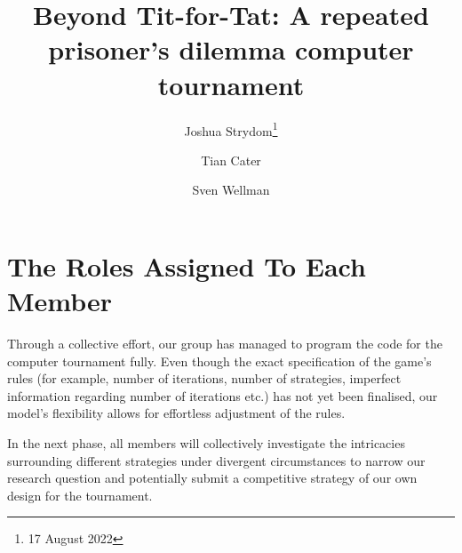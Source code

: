 \documentclass[11pt,preprint, authoryear]{elsarticle}
\numberwithin{equation}{section}
\numberwithin{figure}{section}
\numberwithin{table}{section}
\let\rmarkdownfootnote\footnote%
\def\footnote{\protect\rmarkdownfootnote}
\begin{document}
\begin{frontmatter}  %

\title{Beyond Tit-for-Tat: A repeated prisoner's dilemma computer
tournament}





\author[Add1]{Joshua Strydom\footnote{17 August 2022}}

\author[Add1]{Tian Cater}

\author[Add1,Add2]{Sven Wellman}



\address[Add1]{Advanced Microeconomics First Proposal: Group 2}



\vspace{1cm}





\vspace{0.5cm}

\end{frontmatter}



\pagestyle{fancy}
\chead{}
\rhead{}
\lfoot{}
\lhead{}
\cfoot{}


\headsep 35pt %




\hypertarget{the-roles-assigned-to-each-member}{%
\section{The Roles Assigned To Each
Member}\label{the-roles-assigned-to-each-member}}

Through a collective effort, our group has managed to program the code
for the computer tournament fully. Even though the exact specification
of the game's rules (for example, number of iterations, number of
strategies, imperfect information regarding number of iterations etc.)
has not yet been finalised, our model's flexibility allows for
effortless adjustment of the rules.

In the next phase, all members will collectively investigate the
intricacies surrounding different strategies under divergent
circumstances to narrow our research question and potentially submit a
competitive strategy of our own design for the tournament.
\end{document}
